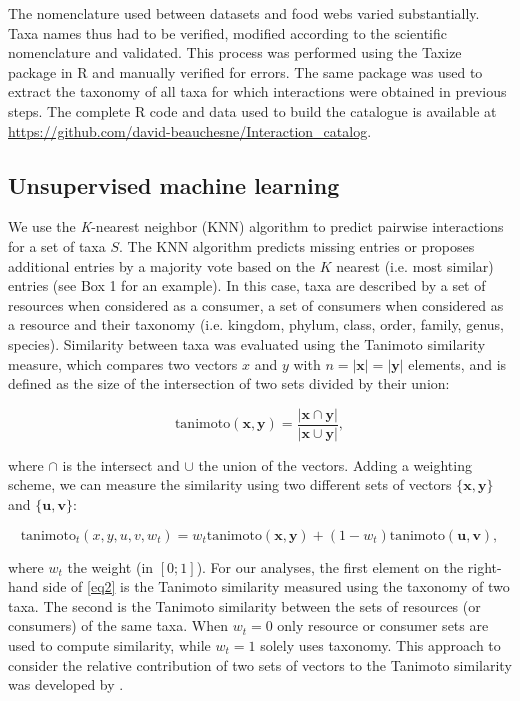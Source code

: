 The nomenclature used between datasets and food webs varied substantially. Taxa names thus had to be verified, modified according to the scientific nomenclature and validated. This process was performed using the Taxize package in R \citep{chamberlain2013, chamberlain2014} and manually verified for errors. The same package was used to extract the taxonomy of all taxa for which interactions were obtained in previous steps. The complete R code and data used to build the catalogue is available at \href{https://github.com/david-beauchesne/Interaction_catalog}{https://github.com/david-beauchesne/Interaction\_catalog}.

\subsection{Unsupervised machine learning}
We use the \textit{K}-nearest neighbor (KNN) algorithm \citep{murphy2012} to predict pairwise interactions for a set of taxa $S$. The KNN algorithm predicts missing entries or proposes additional entries by a majority vote based on the $K$ nearest (i.e. most similar) entries (see Box 1 for an example). In this case, taxa are described by a set of resources when considered as a consumer, a set of consumers when considered as a resource and their taxonomy (i.e. kingdom, phylum, class, order, family, genus, species). Similarity between taxa was evaluated using the Tanimoto similarity measure, which compares two vectors $x$ and $y$ with $n = \left\vert{\mathbf{x}}\right\vert = \left\vert{\mathbf{y}}\right\vert$ elements, and is defined as the size of the intersection of two sets divided by their union:

\begin{equation}
\mbox{tanimoto}(\mathbf{x}, \mathbf{y}) = \frac{\left\vert\mathbf{x} \cap \mathbf{y}\right\vert}{\left\vert\mathbf{x} \cup \mathbf{y}\right\vert},
\end{equation}

where \(\cap\) is the intersect and \(\cup\) the union of the vectors. Adding a weighting scheme, we can measure the similarity using two different sets of vectors \(\{\mathbf{x}, \mathbf{y}\}\) and \(\{\mathbf{u}, \mathbf{v}\}\):

\begin{equation}
\label{eq2}
\mbox{tanimoto}_t(x, y, u, v, w_t) = w_t\mbox{tanimoto}(\mathbf{x}, \mathbf{y}) + (1 - w_t)\mbox{tanimoto}(\mathbf{u}, \mathbf{v}),
\end{equation}

where $w_t$ the weight (in $[0;1]$). For our analyses, the first element on the right-hand side of \eqref{eq2} is the Tanimoto similarity measured using the taxonomy of two taxa. The second is the Tanimoto similarity between the sets of resources (or consumers) of the same taxa. When $w_t = 0$ only resource or consumer sets are used to compute similarity, while $w_t = 1$ solely uses taxonomy. This approach to consider the relative contribution of two sets of vectors to the Tanimoto similarity was developed by \citet{desjardins-proulx2016}.

